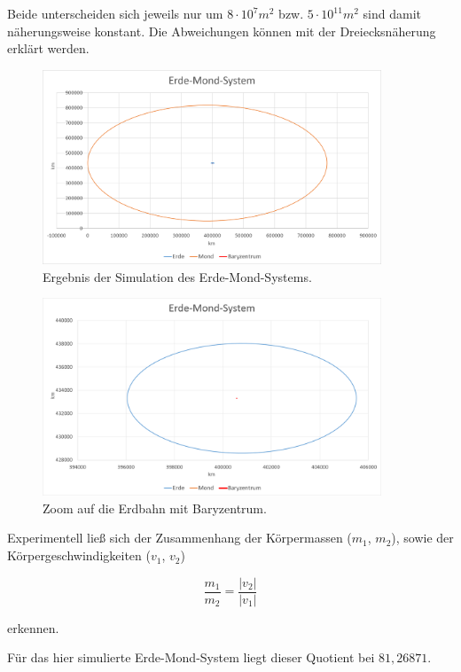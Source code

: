 \documentclass[10pt,twocolumn]{scrartcl}
\newcommand{\abs}[1]{\ensuremath{\left\vert#1\right\vert}}
\begin{document}
Beide unterscheiden sich jeweils nur um $8 \cdot 10^7 m^2$ bzw. $5 \cdot 10^{11} m^2$ sind damit näherungsweise konstant. Die Abweichungen können mit der Dreiecksnäherung erklärt werden.

\begin{figure}[t]
\centering
\includegraphics[width=0.90\textwidth]{Bilder/simulation.png}
\caption{Ergebnis der Simulation des Erde-Mond-Systems.}
\label{fig:sim}
\end{figure}

\begin{figure}[t]
\centering
\includegraphics[width=0.90\textwidth]{Bilder/zoomErde.png}
\caption{Zoom auf die Erdbahn mit Baryzentrum.}
\label{fig:zoom}
\end{figure}

Experimentell ließ sich der Zusammenhang der Körpermassen ($m_1$, $m_2$), sowie der Körpergeschwindigkeiten ($v_1$, $v_2$)

\begin{equation}\frac{m_1}{m_2} = \frac{\abs{v_2}}{\abs{v_1}}
\label{rot}
\end{equation}

erkennen.

Für das hier simulierte Erde-Mond-System liegt dieser Quotient bei $81,26871$.
\end{document}
